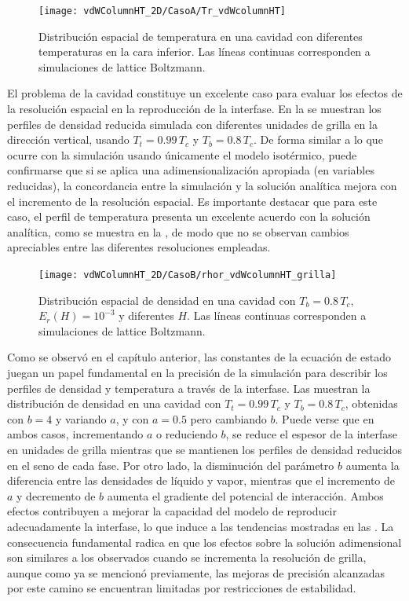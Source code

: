 \begin{figure}[ht]
	\centering
	\texttt{[image: vdWColumnHT\_2D/CasoA/Tr\_vdWcolumnHT]}
	\caption{Distribuci\'on espacial de temperatura en una cavidad con diferentes temperaturas en la cara inferior. Las l\'ineas continuas corresponden a simulaciones de lattice Boltzmann.}
	\label{fig:vdWColumnHT_Tr}
\end{figure}

El problema de la cavidad constituye un excelente caso para evaluar los efectos de la resoluci\'on espacial en la reproducci\'on de la interfase. En la  se muestran los perfiles de densidad reducida simulada con diferentes unidades de grilla en la direcci\'on vertical, usando $T_t = 0.99 \, T_c$ y $T_b = 0.8 \, T_c$. De forma similar a lo que ocurre con la simulaci\'on usando \'unicamente el modelo isot\'ermico, puede confirmarse que si se aplica una adimensionalizaci\'on apropiada (en variables reducidas), la concordancia entre la simulaci\'on y la soluci\'on anal\'itica mejora con el incremento de la resoluci\'on espacial. Es importante destacar que para este caso, el perfil de temperatura presenta un excelente acuerdo con la soluci\'on anal\'itica, como se muestra en la , de modo que no se observan cambios apreciables entre las diferentes resoluciones empleadas.

\begin{figure}[ht]
	\centering
	\texttt{[image: vdWColumnHT\_2D/CasoB/rhor\_vdWcolumnHT\_grilla]}
	\caption{Distribuci\'on espacial de densidad en una cavidad con $T_b = 0.8 \, T_c$, $E_r(H)=10^{-3}$ y diferentes $H$. Las l\'ineas continuas corresponden a simulaciones de lattice Boltzmann.}
	\label{fig:vdWColumnHT_rhor_grilla}
\end{figure}

Como se observ\'o en el cap\'itulo anterior, las constantes de la ecuaci\'on de estado juegan un papel fundamental en la precisi\'on de la simulaci\'on para describir los perfiles de densidad y temperatura a trav\'es de la interfase. Las  muestran la distribuci\'on de densidad en una cavidad con $T_t = 0.99 \, T_c$ y $T_b = 0.8 \, T_c$, obtenidas con $b=4$ y variando $a$, y con $a=0.5$ pero cambiando $b$. Puede verse que en ambos casos, incrementando $a$ o reduciendo $b$, se reduce el espesor de la interfase en unidades de grilla mientras que se mantienen los perfiles de densidad reducidos en el seno de cada fase. Por otro lado, la disminuci\'on del par\'ametro $b$ aumenta la diferencia entre las densidades de l\'iquido y vapor, mientras que el incremento de $a$ y decremento de $b$ aumenta el gradiente del potencial de interacci\'on. Ambos efectos contribuyen a mejorar la capacidad del modelo \pp{} de reproducir adecuadamente la interfase, lo que induce a las tendencias mostradas en las . La consecuencia fundamental radica en que los efectos sobre la soluci\'on adimensional son similares a los observados cuando se incrementa la resoluci\'on de grilla, aunque como ya se mencion\'o previamente, las mejoras de precisi\'on alcanzadas por este camino se encuentran limitadas por restricciones de estabilidad.


